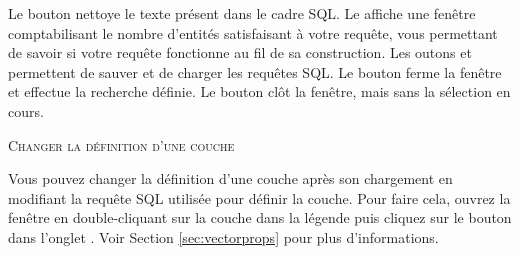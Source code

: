 Le bouton  nettoye le texte présent dans le cadre SQL. Le 
 affiche une fenêtre comptabilisant le nombre d'entités satisfaisant 
à votre requête, vous permettant de savoir si votre requête fonctionne au fil 
de sa construction. Les outons  et  permettent de 
sauver et de charger les requêtes SQL. Le bouton  ferme la fenêtre et 
effectue la recherche définie. Le bouton  clôt la fenêtre, mais 
sans la sélection en cours.

\begin{Tip}\caption{\textsc{Changer la définition d'une couche}}

Vous pouvez changer la définition d'une couche après son chargement en modifiant 
la requête SQL utilisée pour définir la couche. Pour faire cela, ouvrez la fenêtre 
 en double-cliquant sur la couche dans la légende 
puis cliquez sur le bouton  dans l'onglet 
. Voir Section \ref{sec:vectorprops} pour plus d'informations.
\end{Tip}

